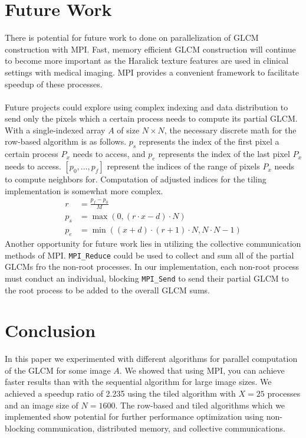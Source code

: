 \documentclass{article}
\begin{document}
\section{Future Work}
There is potential for future work to done on parallelization of GLCM construction with MPI. Fast, memory efficient GLCM construction will continue to become more important as the Haralick texture features are used in clinical settings with medical imaging. MPI provides a convenient framework to facilitate speedup of these processes. \\ \\ 
Future projects could explore using complex indexing and data distribution to send only the pixels which a certain process needs to compute its partial GLCM. With a single-indexed array $A$ of size $N \times N$, the necessary discrete math for the row-based algorithm is as follows. $p_s$ represents the index of the first pixel a certain process $P_x$ needs to access, and $p_e$ represents the index of the last pixel $P_x$ needs to access. $[p_0, ..., p_f] $ represent the indices of the range of pixels $P_x$ needs to compute neighbors for. Computation of adjusted indices for the tiling implementation is somewhat more complex.
\begin{align}
    r &= \frac{p_f - p_0}{M}\\
    p_s &= \max \left ( 0, \left ( r \cdot x - d  \right) \cdot N \right)\\
    p_e &= \min \left ( \left ( x + d \right) \cdot (r + 1) \cdot N, N \cdot N - 1 \right)
\end{align}
Another opportunity for future work lies in utilizing the collective communication methods of MPI. \texttt{MPI\_Reduce} could be used to collect and sum all of the partial GLCMs fro the non-root processes. In our implementation, each non-root process must conduct an individual, blocking \texttt{MPI\_Send} to send their partial GLCM to the root process to be added to the overall GLCM sums. 
\section{Conclusion }
In this paper we experimented with different algorithms for parallel computation of the GLCM for some image $A$. We showed that using MPI, you can achieve faster results than with the sequential algorithm for large image sizes. We achieved a speedup ratio of 2.235 using the tiled algorithm with $X = 25$ processes and an image size of $N = 1600$. The row-based and tiled algorithms which we implemented show potential for further performance optimization using non-blocking communication, distributed memory, and collective communications. 
\end{document}
